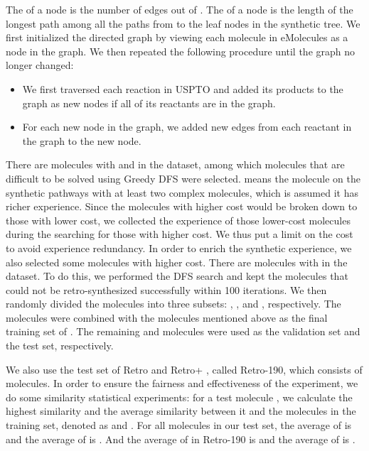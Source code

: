 \documentclass[sn-mathphys,Numbered]{sn-jnl}
\begin{document}
The  of a node  is the number of edges out of . 
The  of a node  is the length of the longest path among all the paths from  to the leaf nodes in the synthetic tree. 
We first initialized the directed graph by viewing each molecule in eMolecules as a node in the graph. We then repeated the following procedure until the graph no longer changed:
\begin{itemize}
    \item We first traversed each reaction in USPTO and added its products to the graph as new nodes if all of its reactants are in the graph.
    \item For each new node in the graph, we added new edges from each reactant in the graph to the new node. 
\end{itemize} 
There are  molecules with  and  in the dataset, among which  molecules that are difficult to be solved using Greedy DFS were selected.  means the molecule on the synthetic pathways with at least two complex molecules, which is assumed it has richer experience. Since the molecules with higher cost would be broken down to those with lower cost, we collected the experience of those lower-cost molecules during the searching for those with higher cost. We thus put a limit on the cost to avoid experience redundancy. In order to enrich the synthetic experience, we also selected some molecules with higher cost. There are  molecules with  in the dataset. To do this, we performed the DFS search and kept the  molecules that could not be retro-synthesized successfully within 100 iterations. We then randomly divided the  molecules into three subsets: , , and , respectively. The  molecules were combined with the  molecules mentioned above as the final training set of . The remaining  and  molecules were used as the validation set and the test set, respectively.

We also use the test set of Retro \cite{retro2020} and Retro+ \cite{2022}, called Retro-190, which consists of  
molecules. In order to ensure the fairness and effectiveness of the experiment, we do some similarity statistical experiments: for a test molecule , we calculate the highest similarity and the average similarity between it and the molecules in the training set, denoted as  and . 
For all molecules in our test set, the average of  is  and the average of  is . And the average of  in Retro-190 is  and the average of  is .
\end{document}
